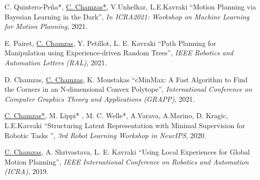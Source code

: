 \documentclass[letterpaper,11pt]{article}
\begin{document}
\begin{thebibliography}{9}
     C. Quintero-Peña*, \underline{C. Chamzas*}, V.Unhelkar, L.E.Kavraki
	``Motion Planning via Bayesian Learning in the Dark'',
    \textit{In ICRA2021: Workshop on Machine Learning for Motion Planning}, 2021.  

	E. Pairet, \underline{C. Chamzas}, Y. Petillot, L. E. Kavraki
	``Path Planning for Manipulation using Experience-driven Random Trees'',
    \textit{IEEE Robotics and Automation Letters (RAL)}, 2021.
	
	D. Chamzas, \underline{C. Chamzas}, K. Moustakas
	``cMinMax: A Fast Algorithm to Find the Corners in an N-dimensional Convex Polytope'',
    \textit{International Conference on Computer Graphics Theory and Applications (GRAPP)}, 2021. 

	\underline{C. Chamzas*}, M. Lippi* , M. C. Welle*, A.Varava, A.Marino, D. Kragic, L.E.Kavraki
    ``Structuring Latent Representation with Minimal Supervision for Robotic Tasks '',
    \textit{3rd Robot Learning Workshop in NeurIPS}, 2020. 

	\underline{C. Chamzas}, A. Shrivastava, L. E. Kavraki
	``Using Local Experiences for Global Motion Planning'',
    \textit{IEEE International Conference on Robotics and Automation (ICRA)}, 2019.
   
	\end{thebibliography}
	\endgroup
\end{document}
